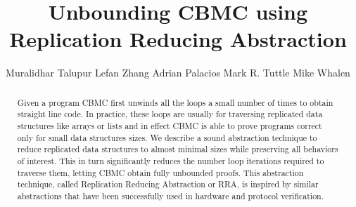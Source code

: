 \documentclass[runningheads]{llncs}
\begin{document}
%
\title{Unbounding CBMC using Replication Reducing Abstraction}
%
%
\author{Muralidhar Talupur 
  Lefan Zhang 
  Adrian Palacios 
  Mark R. Tuttle
  Mike Whalen
}

%

%
\maketitle              %
%
\begin{abstract}
Given a program CBMC first unwinds all the loops a small number of
times to obtain straight line code. In practice, these loops are
usually for traversing replicated data structures like arrays or lists
and in effect CBMC is able to prove programs correct only for small
data structures sizes. We describe a sound abstraction technique to
reduce replicated data structures to almost minimal sizes while
preserving all behaviors of interest. This in turn significantly
reduces the number loop iterations required to traverse them, letting
CBMC obtain fully unbounded proofs. This abstraction technique, called
Replication Reducing Abstraction or RRA, is inspired by similar
abstractions that have been successfully used in hardware and protocol
verification.

  
\end{abstract}
%
%
%


%








\end{document}
